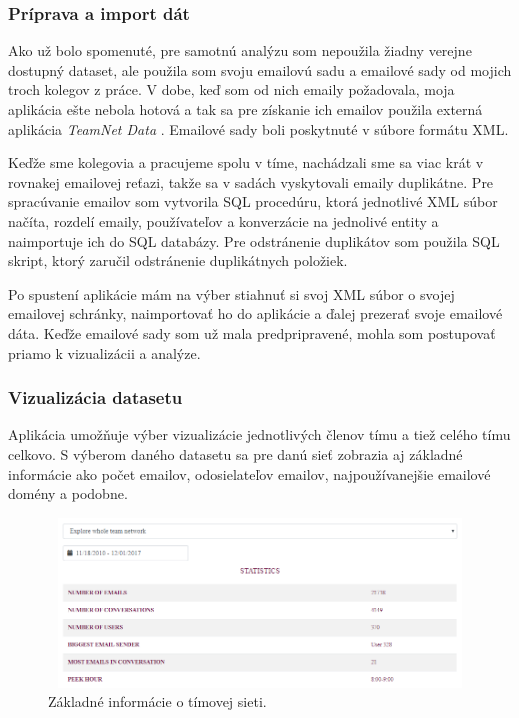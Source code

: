\documentclass[slovak,master,public,dept460,male,cpdeclaration,oneside]{diploma}
\begin{document}
\subsubsection{Príprava a import dát}
Ako už bolo spomenuté, pre samotnú analýzu som nepoužila žiadny verejne dostupný dataset, ale použila som svoju emailovú sadu a emailové sady od mojich troch kolegov z práce. V dobe, keď som od nich emaily požadovala, moja aplikácia ešte nebola hotová a tak sa pre získanie ich emailov použila externá aplikácia \textit{TeamNet Data} \cite{5}. Emailové sady boli poskytnuté v súbore formátu XML.


Keďže sme kolegovia a pracujeme spolu v tíme, nachádzali sme sa viac krát v rovnakej emailovej reťazi, takže sa v sadách vyskytovali emaily duplikátne. Pre spracúvanie emailov som vytvorila SQL procedúru, ktorá jednotlivé XML súbor načíta, rozdelí emaily, používateľov a konverzácie na jednolivé entity a naimportuje ich do SQL databázy. Pre odstránenie duplikátov som použila SQL skript, ktorý zaručil odstránenie duplikátnych položiek. 

Po spustení aplikácie mám na výber stiahnuť si svoj XML súbor o svojej emailovej schránky, naimportovať ho do aplikácie a ďalej prezerať svoje emailové dáta. Keďže emailové sady som už mala predpripravené, mohla som postupovať priamo k vizualizácii a analýze.



\subsubsection{Vizualizácia datasetu}
Aplikácia umožňuje výber vizualizácie jednotlivých členov tímu a tiež celého tímu celkovo. S výberom daného datasetu sa pre danú sieť zobrazia aj základné informácie ako počet emailov, odosielateľov emailov, najpoužívanejšie emailové domény a podobne.


\begin{figure}[H]
\centering
\includegraphics[width=12cm, height=4.5cm]{figures/team_tab_celkovo}
\caption{Základné informácie o tímovej sieti.}
\label{team_tab_celkovo}
\end{figure}
\end{document}
